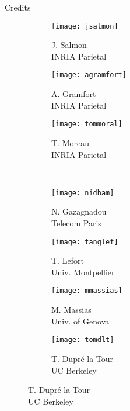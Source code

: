 \documentclass[unknownkeysallowed]{beamer}
\begin{document}
\begin{frame}{Credits}
    \begin{figure}
         \centering
         \hfill
         \begin{subfigure}[b]{0.188\textwidth}
             \centering
            \texttt{[image: jsalmon]}
            \caption{J. Salmon\\ INRIA Parietal}
         \end{subfigure}
         \hfill
         \begin{subfigure}[b]{0.188\textwidth}
             \centering
            \texttt{[image: agramfort]}
            \caption{A. Gramfort\\ INRIA Parietal}
         \end{subfigure}
         \hfill
         \begin{subfigure}[b]{0.188\textwidth}
             \centering
            \texttt{[image: tommoral]}
            \caption{T. Moreau\\ INRIA Parietal}
         \end{subfigure}\hfill\\[2em]
         \begin{subfigure}[b]{0.188\textwidth}
             \centering
             \texttt{[image: nidham]}
             \caption{N. Gazagnadou\\Telecom Paris}
         \end{subfigure}
         \hfill
         \begin{subfigure}[b]{0.188\textwidth}
             \centering
            \texttt{[image: tanglef]}
             \caption{T. Lefort\\Univ. Montpellier}
         \end{subfigure}
         \hfill
         \begin{subfigure}[b]{0.188\textwidth}
             \centering
             \texttt{[image: mmassias]}
             \caption{M. Massias\\Univ. of Genova }
         \end{subfigure}
         \hfill
         \begin{subfigure}[b]{0.188\textwidth}
             \centering
            \texttt{[image: tomdlt]}
            \caption{T. Dupré la Tour\\ UC Berkeley}
         \end{subfigure}
    \end{figure}
\end{frame}




\end{document}
